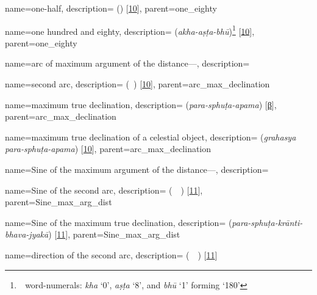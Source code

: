 {
        name={one-half},
        description={ (\nisf) [\hyperlink{PEpass10}{10}]},
        parent={one_eighty}
}

{
        name={one hundred and eighty},
        description={ (\textit{akha-aṣṭa-bhū})\footnote{\,\bhutasamkhya\ word-numerals: \textit{kha} `0', \textit{aṣṭa} `8', and  \textit{bhū} `1' forming `180'} [\hyperlink{SEpass10}{10}]},
        parent={one_eighty}
}

{
        name={arc of maximum argument of the distance---},
        description={\phantom{x}\nopagebreak}
}

{
        name={second arc},
        description={ (\qaws\idafaconsonant\ \duvum) [\hyperlink{PEpass10}{10}]},
        parent={arc_max_declination}
}

{
        name={maximum true declination},
        description={ (\textit{para-sphuṭa-apama}) [\hyperlink{SEpassB}{β}]},
        parent={arc_max_declination}
}    

{
        name={maximum true declination of a celestial object},
        description={\newline{} (\textit{grahasya para-sphuṭa-apama}) [\hyperlink{SEpass10}{10}]},
        parent={arc_max_declination}
}        

{
        name={Sine of the maximum argument of the distance---},
        description={\phantom{x}\nopagebreak}
}

{
        name={Sine of the second arc},
        description={ (\jayb\idafaconsonant\ \qaws\idafaconsonant\ \duvum) [\hyperlink{PEpass11}{11}]},
        parent={Sine_max_arg_dist}
}

{
        name={Sine of the maximum true declination},
        description={ (\textit{para-sphuṭa-krānti-bhava-jyakā}) [\hyperlink{SEpass11}{11}]},
        parent={Sine_max_arg_dist}
}        


{
        name={direction of the second arc},
        description={ (\jahat\idafaconsonant\ \qaws\idafaconsonant\ \duvum) [\hyperlink{PEpass11}{11}]}
}

